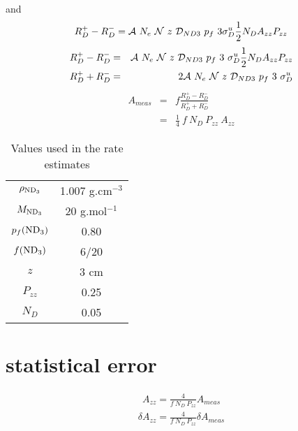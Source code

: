 \documentclass[11pt]{article}
\begin{document}
and
\begin{eqnarray}
R^+_D - R^-_D = {\cal A}~N_e~{\cal N}~z~ {\cal D}_{ND3}~p_f~ 3 \sigma^u_D \frac{1}{2} N_D A_{zz} P_{zz}
\label{p3} 
\end{eqnarray}
\begin{eqnarray}
R^+_D - R^-_D &=& {\cal A}~N_e~{\cal N}~z~ {\cal D}_{ND3}~p_f~ 3~\sigma^u_D \frac{1}{2} N_D A_{zz} P_{zz} \\
R^+_D + R^-_D &=& 2 {\cal A}~N_e~{\cal N}~z~ {\cal D}_{ND3}~p_f~3~\sigma^u_D
\label{p4} 
\end{eqnarray}
\begin{eqnarray}
A_{meas} &=& f \frac{R^+_D - R^-_D}{R^+_D + R^-_D} \\
                  &=& \frac{1}{4}~f~N_D~P_{zz}~A_{zz} 
\label{rdf} 
\end{eqnarray}




\begin{table}[htdp]
\caption{Values used in the rate estimates}
\begin{center}
\begin{tabular}{|c|c|}
\hline
$\rho_{\rm ND_3}$     &    1.007 g.cm$^{-3}$   \\
$M_{\rm ND_3}$         &    20 g.mol$^{-1}$       \\
$p_f({\rm ND_3})$      &    0.80                            \\
$f({\rm ND_3})$           &    6/20                           \\
$z$                                &    3 cm                            \\
$P_{zz}$                      &     0.25                            \\
$N_D$                          &    0.05                             \\
\hline
\end{tabular}
\end{center}
\label{default}
\end{table}%

\section{statistical error}
 \begin{eqnarray}
A_{zz}  = \frac{4}{f~N_D~P_{zz}} A_{meas}
\label{stat1} 
\end{eqnarray}
 \begin{eqnarray}
\delta A_{zz} = \frac{4}{f~N_D~P_{zz}} \delta A_{meas}
\label{stat2} 
\end{eqnarray}
\end{document}
